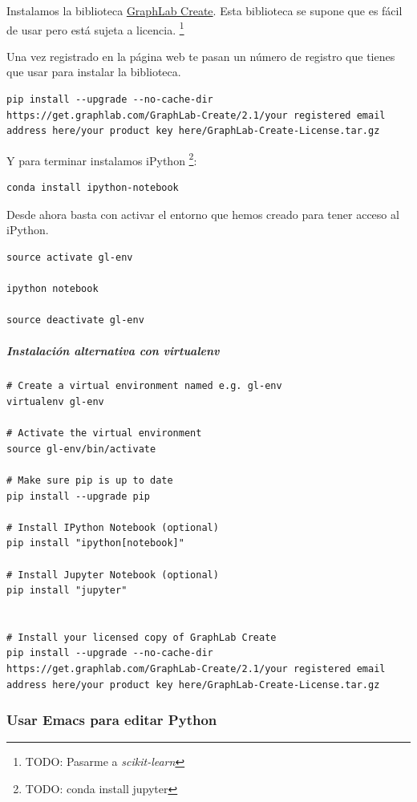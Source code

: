 \documentclass[12pt,spanish,]{scrartcl}
\let\oldsubparagraph\subparagraph
\renewcommand{\subparagraph}[1]{\oldsubparagraph{#1}\mbox{}}
\begin{document}
Instalamos la biblioteca
\href{https://turi.com/products/create/}{GraphLab Create}. Esta
biblioteca se supone que es fácil de usar pero está sujeta a licencia.
\footnote{TODO: Pasarme a \emph{scikit-learn}}

Una vez registrado en la página web te pasan un número de registro que
tienes que usar para instalar la biblioteca.

\begin{verbatim}
pip install --upgrade --no-cache-dir https://get.graphlab.com/GraphLab-Create/2.1/your registered email address here/your product key here/GraphLab-Create-License.tar.gz
\end{verbatim}

Y para terminar instalamos iPython \footnote{TODO: conda install jupyter}:

\begin{verbatim}
conda install ipython-notebook
\end{verbatim}

Desde ahora basta con activar el entorno que hemos creado para tener
acceso al iPython.

\begin{verbatim}
source activate gl-env

ipython notebook

source deactivate gl-env
\end{verbatim}

\hypertarget{instalaciuxf3n-alternativa-con-virtualenv}{%
\subparagraph{Instalación alternativa con
virtualenv}\label{instalaciuxf3n-alternativa-con-virtualenv}}

\begin{verbatim}
# Create a virtual environment named e.g. gl-env
virtualenv gl-env

# Activate the virtual environment
source gl-env/bin/activate

# Make sure pip is up to date
pip install --upgrade pip

# Install IPython Notebook (optional)
pip install "ipython[notebook]"

# Install Jupyter Notebook (optional)
pip install "jupyter"


# Install your licensed copy of GraphLab Create
pip install --upgrade --no-cache-dir https://get.graphlab.com/GraphLab-Create/2.1/your registered email address here/your product key here/GraphLab-Create-License.tar.gz
\end{verbatim}

\hypertarget{usar-emacs-para-editar-python}{%
\subsubsection{Usar Emacs para editar
Python}\label{usar-emacs-para-editar-python}}
\end{document}
